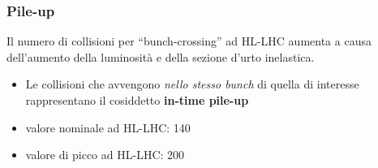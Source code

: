 \documentclass{beamer}
\begin{document}
\begin{frame}[t]
\frametitle{Pile-up}
Il numero di collisioni per ``bunch-crossing'' ad HL-LHC aumenta
a causa dell'aumento della luminosit\`a e della sezione d'urto inelastica.\\

\begin{itemize}
\item Le collisioni che avvengono \textit{nello stesso bunch} di quella di interesse
rappresentano il cosiddetto \textbf{in-time pile-up}
\item valore nominale ad HL-LHC: 140
\item valore di picco ad HL-LHC: 200
\end{itemize}




\end{frame}




\end{document}
